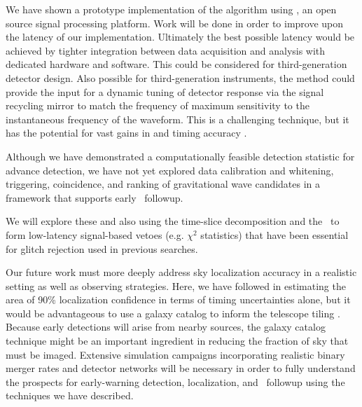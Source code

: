 We have shown a prototype implementation of the \lloid{} algorithm using
\gstreamer, an open source signal processing platform.  Work will be done in
order to improve upon the latency of our implementation.  Ultimately the best
possible latency would be achieved by tighter integration between data
acquisition and analysis with dedicated hardware and software. This could be
considered for third-generation detector design.  Also possible for
third-generation instruments, the \lloid{} method could provide the input for a
dynamic tuning of detector response via the signal recycling mirror to match
the frequency of maximum sensitivity to the instantaneous frequency of the
\GW{} waveform.  This is a challenging technique, but it has the potential for
vast gains in \SNR{} and timing accuracy \citep{PhysRevD.47.2184}.

Although we have demonstrated a computationally feasible detection statistic
for advance detection, we have not yet explored data calibration and whitening,
triggering, coincidence, and ranking of gravitational wave candidates in a
framework that supports early \EM\ followup.
\begin{comment}
One complication in deploying a
low-latency or early-warning search is that whitening the detector data
involves estimating the noise power spectrum, which is often done acausally.
We will have to look into causal or low latency alternatives to conventional
spectral estimation techniques.  
\end{comment}
We will explore these and also using the time-slice decomposition and the \SVD\
to form low-latency signal-based vetoes (e.g.  $\chi^2$ statistics) that have
been essential for glitch rejection used in previous \GW{} \CBC{} searches.

\begin{comment}
Another potential complication is that if adjacent time slices have non-negligible
cross-correlation with each other, then there may be some subtleties in the design
of the triggering and coincidence stages that we must address in order to translate
the early-warning outputs into candidate events.  On the other hand, the time-slice
decomposition and the \SVD\ may be beneficial for the postprocessing stage
because they will help us form low-latency signal-based vetoes (e.g. $\chi^2$ statistics)
that have been essential for glitch rejection used in previous \GW{} \CBC{}
searches.
\end{comment}

Our future work must more deeply address sky localization accuracy in a
realistic setting as well as observing strategies. Here, we have followed
\citet{Fairhurst2009} in estimating the area of 90\% localization confidence in
terms of timing uncertainties alone, but it would be advantageous to use a
galaxy catalog to inform the telescope tiling \citep{galaxy-catalog}. Because
early detections will arise from nearby sources, the galaxy catalog technique
might be an important ingredient in reducing the fraction of sky that must be
imaged.  Extensive simulation campaigns incorporating realistic binary merger
rates and detector networks will be necessary in order to fully understand the
prospects for early-warning detection, localization, and \EM\ followup using
the techniques we have described.


